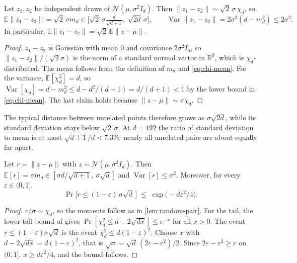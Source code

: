 \documentclass{article} %
\theoremstyle{definition}
\theoremstyle{remark}
\begin{document}
\begin{lemma}
\label{lem:random-pair}
Let $z_1,z_2$ be independent draws of $\mathcal N(\mu,\sigma^2 I_d)$. Then
$\|z_1-z_2\|\sim\sqrt2\,\sigma\,\chi_d$, so
\[
  \mathbb E\|z_1-z_2\|=\sqrt2\,\sigma m_d\in\Big[\sqrt2\,\sigma\tfrac{d}{\sqrt{d+1}},\ \sqrt{2d}\,\sigma\Big],
  \qquad
  \operatorname{Var}\|z_1-z_2\|=2\sigma^2(d-m_d^2)\le 2\sigma^2 .
\]
In particular, $\mathbb E\|z_1-z_2\|=\sqrt2\,\mathbb E\|z-\mu\|$.
\end{lemma}
\begin{proof}
$z_1-z_2$ is Gaussian with mean $0$ and covariance $2\sigma^2 I_d$, so $\|z_1-z_2\|/(\sqrt2\sigma)$
is the norm of a standard normal vector in $\mathbb R^d$, which is $\chi_d$-distributed. The
mean follows from the definition of $m_d$ and \cref{eq:chi-mean}. For the variance,
$\mathbb E[\chi_d^2]=d$, so $\operatorname{Var}[\chi_d]=d-m_d^2\le d-d^2/(d+1)=d/(d+1)<1$ by the
lower bound in \cref{eq:chi-mean}. The last claim holds because $\|z-\mu\|\sim\sigma\chi_d$.
\end{proof}

The typical distance between unrelated points therefore grows as $\sigma\sqrt{2d}$, while its
standard deviation stays below $\sqrt2\,\sigma$. At $d=192$ the ratio of standard deviation to mean is at most $\sqrt{d+1}/d<7.3\%$:
nearly all unrelated pairs are about equally far apart.

\begin{proposition}
\label{prop:shell}
Let $r=\|z-\mu\|$ with $z\sim\mathcal N(\mu,\sigma^2 I_d)$. Then
$\mathbb E[r]=\sigma m_d\in[\sigma d/\sqrt{d+1},\ \sigma\sqrt d]$ and
$\operatorname{Var}[r]\le\sigma^2$. Moreover, for every $\varepsilon\in(0,1]$,
\[
  \Pr\big[r\le(1-\varepsilon)\,\sigma\sqrt d\,\big]\;\le\;\exp\!\big(-d\varepsilon^2/4\big).
\]
\end{proposition}
\begin{proof}
$r/\sigma\sim\chi_d$, so the moments follow as in \cref{lem:random-pair}. For the tail, the
lower-tail bound of \citet{laurent2000adaptive} gives
$\Pr[\chi_d^2\le d-2\sqrt{dx}]\le e^{-x}$ for all $x>0$. The event
$r\le(1-\varepsilon)\sigma\sqrt d$ is the event $\chi_d^2\le d(1-\varepsilon)^2$. Choose $x$
with $d-2\sqrt{dx}=d(1-\varepsilon)^2$, that is $\sqrt x=\sqrt d\,(2\varepsilon-\varepsilon^2)/2$.
Since $2\varepsilon-\varepsilon^2\ge\varepsilon$ on $(0,1]$, $x\ge d\varepsilon^2/4$, and the bound
follows.
\end{proof}
\end{document}
